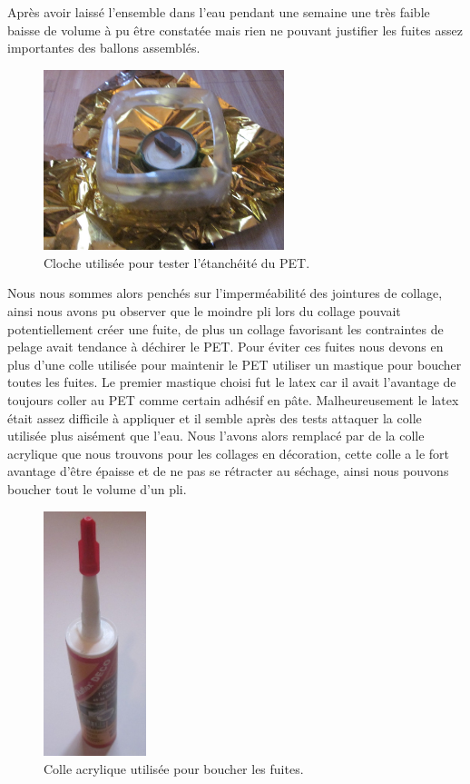 \documentclass[a4paper,11pt]{article}
\begin{document}
Après avoir laissé l'ensemble dans l'eau pendant une semaine une très faible baisse de volume à pu être constatée mais rien ne pouvant justifier les fuites assez importantes des ballons assemblés.

\begin{figure}[H]
 \centering
 \includegraphics[width=7cm]{../Images/cloche_pet.JPG}
 \caption{Cloche utilisée pour tester l'étanchéité du PET.}
\end{figure}



Nous nous sommes alors penchés sur l’imperméabilité des jointures de collage, ainsi nous avons pu observer que le moindre pli lors du collage pouvait potentiellement créer une fuite, de plus un collage favorisant les contraintes de pelage avait tendance à déchirer le PET. Pour éviter ces fuites nous devons en plus d'une colle utilisée pour maintenir le PET utiliser un mastique pour boucher toutes les fuites. Le premier mastique choisi fut le latex car il avait l'avantage de toujours coller au PET comme certain adhésif en pâte. Malheureusement le latex était assez difficile à appliquer et il semble après des tests attaquer la colle utilisée plus aisément que l'eau. Nous l'avons alors remplacé par de la colle acrylique que nous trouvons pour les collages en décoration, cette colle a le fort avantage d'être épaisse et de ne pas se rétracter au séchage, ainsi nous pouvons boucher tout le volume d'un pli.

\begin{figure}[H]
 \centering
 \includegraphics[width=3cm]{../Images/colle_acrylique.JPG}
 \caption{Colle acrylique utilisée pour boucher les fuites.}
\end{figure}
\end{document}
